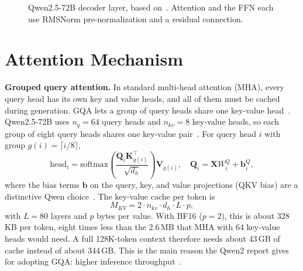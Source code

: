 \documentclass[conference]{IEEEtran}
\begin{document}
\begin{figure}[t]
\centering
{}
\caption{Qwen2.5-72B decoder layer, based on~\cite{qwen25,qwen2,qwen25card}. Attention and the FFN each use RMSNorm pre-normalization and a residual connection.}
\label{fig:arch}
\end{figure}

\section{Attention Mechanism}
\textbf{Grouped query attention.} In standard multi-head attention (MHA), every query head has its own key and value heads, and all of them must be cached during generation. GQA lets a group of query heads share one key-value head~\cite{gqa}. Qwen2.5-72B uses $n_q=64$ query heads and $n_{kv}=8$ key-value heads, so each group of eight query heads shares one key-value pair~\cite{qwen25card}. For query head $i$ with group $g(i)=\lceil i/8\rceil$,
\begin{equation}
\mathrm{head}_i=\mathrm{softmax}\!\left(\frac{\mathbf{Q}_i\mathbf{K}_{g(i)}^{\top}}{\sqrt{d_h}}\right)\mathbf{V}_{g(i)},\quad \mathbf{Q}_i=\mathbf{X}W^{Q}_i+\mathbf{b}^{Q}_i,
\end{equation}
where the bias terms $\mathbf{b}$ on the query, key, and value projections (QKV bias) are a distinctive Qwen choice~\cite{qwen25}. The key-value cache per token is
\begin{equation}
M_{KV}=2\cdot n_{kv}\cdot d_h\cdot L\cdot p,
\end{equation}
with $L=80$ layers and $p$ bytes per value. With BF16 ($p=2$), this is about 328\,KB per token, eight times less than the 2.6\,MB that MHA with 64 key-value heads would need. A full 128K-token context therefore needs about 43\,GB of cache instead of about 344\,GB. This is the main reason the Qwen2 report gives for adopting GQA: higher inference throughput~\cite{qwen2}.
\end{document}
